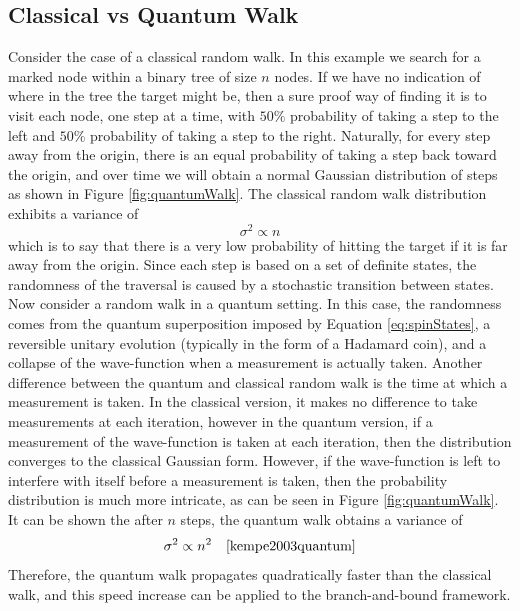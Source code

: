 \subsection{Classical vs Quantum Walk}

Consider the case of a classical random walk. In this example we search for a marked node within a binary tree of size $n$ nodes. 
If we have no indication of where in the tree the target might be, then a sure proof way of finding it is to visit each node, one step at a time, with $50\%$ probability of taking a step to the left and $50\%$ probability of taking a step to the right. 
Naturally, for every step away from the origin, there is an equal probability of taking a step back toward the origin, and over time we will obtain a normal Gaussian distribution of steps as shown in Figure \ref{fig:quantumWalk}. 
The classical random walk distribution exhibits a variance of 
\begin{equation}
	\sigma^2 \propto n
\end{equation}
which is to say that there is a very low probability of hitting the target if it is far away from the origin.
Since  each step is based on a set of definite states, the randomness of the traversal is caused by a stochastic transition between states.
Now consider a random walk in a quantum setting. 
In this case, the randomness comes from the quantum superposition imposed by Equation \ref{eq:spinStates}, a reversible unitary evolution (typically in the form of a Hadamard coin), and a collapse of the wave-function when a measurement is actually taken. 
Another difference between the quantum and classical random walk is the time at which a measurement is taken. 
In the classical version, it makes no difference to take measurements at each iteration, however in the quantum version, if a measurement of the wave-function is taken at each iteration, then the distribution converges to the classical Gaussian form. 
However, if the wave-function is left to interfere with itself before a measurement is taken, then the probability distribution is much more intricate, as can be seen in Figure \ref{fig:quantumWalk}.
It can be shown the after $n$ steps, the quantum walk obtains a variance of 
\begin{equation}
	\sigma^2 \propto n^2 \quad\cite{kempe2003quantum}
\end{equation}
Therefore, the quantum walk propagates quadratically faster than the classical walk, and this speed increase can be applied to the branch-and-bound framework. 
